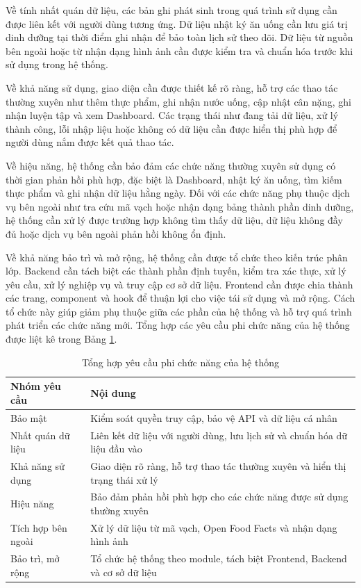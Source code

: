 \documentclass[12pt, a4paper]{report}
\begin{document}
Về tính nhất quán dữ liệu, các bản ghi phát sinh trong quá trình sử dụng cần được liên kết với người dùng tương ứng. Dữ liệu nhật ký ăn uống cần lưu giá trị dinh dưỡng tại thời điểm ghi nhận để bảo toàn lịch sử theo dõi. Dữ liệu từ nguồn bên ngoài hoặc từ nhận dạng hình ảnh cần được kiểm tra và chuẩn hóa trước khi sử dụng trong hệ thống.

Về khả năng sử dụng, giao diện cần được thiết kế rõ ràng, hỗ trợ các thao tác thường xuyên như thêm thực phẩm, ghi nhận nước uống, cập nhật cân nặng, ghi nhận luyện tập và xem Dashboard. Các trạng thái như đang tải dữ liệu, xử lý thành công, lỗi nhập liệu hoặc không có dữ liệu cần được hiển thị phù hợp để người dùng nắm được kết quả thao tác.

Về hiệu năng, hệ thống cần bảo đảm các chức năng thường xuyên sử dụng có thời gian phản hồi phù hợp, đặc biệt là Dashboard, nhật ký ăn uống, tìm kiếm thực phẩm và ghi nhận dữ liệu hằng ngày. Đối với các chức năng phụ thuộc dịch vụ bên ngoài như tra cứu mã vạch hoặc nhận dạng bảng thành phần dinh dưỡng, hệ thống cần xử lý được trường hợp không tìm thấy dữ liệu, dữ liệu không đầy đủ hoặc dịch vụ bên ngoài phản hồi không ổn định.

Về khả năng bảo trì và mở rộng, hệ thống cần được tổ chức theo kiến trúc phân lớp. Backend cần tách biệt các thành phần định tuyến, kiểm tra xác thực, xử lý yêu cầu, xử lý nghiệp vụ và truy cập cơ sở dữ liệu. Frontend cần được chia thành các trang, component và hook để thuận lợi cho việc tái sử dụng và mở rộng. Cách tổ chức này giúp giảm phụ thuộc giữa các phần của hệ thống và hỗ trợ quá trình phát triển các chức năng mới. Tổng hợp các yêu cầu phi chức năng của hệ thống được liệt kê trong Bảng \ref{tab:tong_hop_phi_chuc_nang}.

\begin{table}[htbp]
    \centering
    \caption{Tổng hợp yêu cầu phi chức năng của hệ thống}
\label{tab:tong_hop_phi_chuc_nang}
    \vspace{4pt}
    \renewcommand{\arraystretch}{1.3}
    \begin{tabular}{|>{\raggedright\arraybackslash}p{4cm}|p{11cm}|}
        \hline
        \textbf{Nhóm yêu cầu} & \textbf{Nội dung} \\
        \hline
        Bảo mật & Kiểm soát quyền truy cập, bảo vệ API và dữ liệu cá nhân \\
        \hline
        Nhất quán dữ liệu & Liên kết dữ liệu với người dùng, lưu lịch sử và chuẩn hóa dữ liệu đầu vào \\
        \hline
        Khả năng sử dụng & Giao diện rõ ràng, hỗ trợ thao tác thường xuyên và hiển thị trạng thái xử lý \\
        \hline
        Hiệu năng & Bảo đảm phản hồi phù hợp cho các chức năng được sử dụng thường xuyên \\
        \hline
        Tích hợp bên ngoài & Xử lý dữ liệu từ mã vạch, Open Food Facts và nhận dạng hình ảnh \\
        \hline
        Bảo trì, mở rộng & Tổ chức hệ thống theo module, tách biệt Frontend, Backend và cơ sở dữ liệu \\
        \hline
    \end{tabular}
\end{table}
\end{document}
